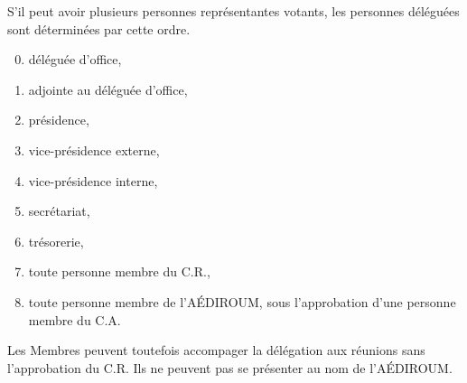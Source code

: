 \documentclass{aediroum}
\begin{document}
S'il peut avoir plusieurs personnes représentantes votants, les personnes déléguées sont déterminées par cette ordre.

\begin{enumerate}\setcounter{enumi}{-1}
\item déléguée d'office,
\item adjointe au déléguée d'office,
\item présidence,
\item vice-présidence externe,
\item vice-présidence interne,
\item secrétariat,
\item trésorerie,
\item toute personne membre du C.R.,
\item toute personne membre de l'AÉDIROUM, sous l'approbation d'une personne membre du C.A.
\end{enumerate}

Les Membres peuvent toutefois accompager la délégation aux réunions sans l'approbation du C.R. Ils ne peuvent pas se présenter au nom de l'AÉDIROUM.
\end{document}
